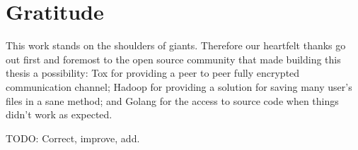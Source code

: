\section*{Gratitude}

This work stands on the shoulders of giants.
Therefore our heartfelt thanks go out first and foremost to the open source community that made building this thesis a possibility: Tox for providing a peer to peer fully encrypted communication channel; Hadoop for providing a solution for saving many user's files in a sane method; and Golang for the access to source code when things didn't work as expected.

TODO: Correct, improve, add.
